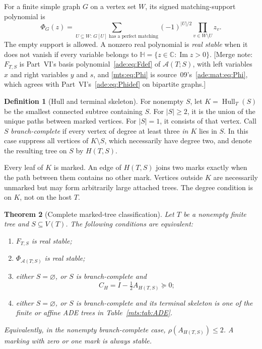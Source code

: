 \documentclass[11pt]{article}
\numberwithin{equation}{section}
\newtheorem{theorem}{Theorem}[section]
\theoremstyle{definition}
\newtheorem{definition}[theorem]{Definition}
\newcommand{\C}{\mathbb C}
\newcommand{\HH}{\mathbb H}
\newcommand{\calA}{\mathcal A}
\newcommand{\im}{\operatorname{Im}}
\newcommand{\Hull}{\operatorname{Hull}}
\begin{document}
For a finite simple graph $G$ on a vertex set $W$, its signed
matching-support polynomial is
\begin{equation}
 \Phi_G(z)=\sum_{U\subseteq W:\,G[U]\text{ has a perfect matching}}
             (-1)^{|U|/2}\prod_{v\in W\setminus U}z_v.
 \label{mts:eq:Phi}
\end{equation}
The empty support is allowed. A nonzero real polynomial is \emph{real
stable} when it does not vanish if every variable belongs to
$\HH=\{z\in\C:\im z>0\}$.
[Merge note: $F_{T,S}$ is Part~VI's basis polynomial~\eqref{ade:eq:Fdef} of
$\calA(T;S)$, with left variables $x$ and right variables $y$ and $s$, and
\eqref{mts:eq:Phi} is source~09's~\eqref{ade:mat:eq:Phi}, which agrees
with Part~VI's~\eqref{ade:eq:Phidef} on bipartite graphs.]

\begin{definition}[Hull and terminal skeleton]
For nonempty $S$, let $K=\Hull_T(S)$ be the smallest connected subtree
containing $S$. For $|S|\ge2$, it is the union of the unique paths between
marked vertices. For $|S|=1$, it consists of that vertex.
Call $S$ \emph{branch-complete} if every vertex of degree at least three
\emph{in $K$} lies in $S$. In this case suppress all vertices of
$K\setminus S$, which necessarily have degree two, and denote the resulting
tree on $S$ by $H(T,S)$.
\end{definition}

Every leaf of $K$ is marked. An edge of $H(T,S)$ joins two marks exactly
when the path between them contains no other mark. Vertices outside $K$
are necessarily unmarked but may form arbitrarily large attached trees.
The degree condition is on $K$, not on the host $T$.

\begin{theorem}[Complete marked-tree classification]\label{mts:thm:main}
Let $T$ be a nonempty finite tree and $S\subseteq V(T)$. The following
conditions are equivalent:
\begin{enumerate}[label=(\roman*)]
\item $F_{T,S}$ is real stable;
\item $\Phi_{\calA(T;S)}$ is real stable;
\item either $S=\varnothing$, or $S$ is branch-complete and
\begin{equation}
 C_H=I-\tfrac12 A_{H(T,S)}\succeq0;
 \label{mts:eq:criterion}
\end{equation}
\item either $S=\varnothing$, or $S$ is branch-complete and its terminal
skeleton is one of the finite or affine ADE trees in Table~\ref{mts:tab:ADE}.
\end{enumerate}
Equivalently, in the nonempty branch-complete case,
$\rho(A_{H(T,S)})\le2$. A marking with zero or one mark is always stable.
\end{theorem}
\end{document}
